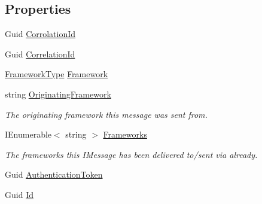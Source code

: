 \subsection*{Properties}
\begin{DoxyCompactItemize}
\item 
Guid \hyperlink{classCqrs_1_1Akka_1_1Tests_1_1Unit_1_1Events_1_1HelloWorldRepliedTo_a899e3a4ea4028b3f13fa31a8af53e02a}{Corrolation\+Id}
\item 
Guid \hyperlink{classCqrs_1_1Akka_1_1Tests_1_1Unit_1_1Events_1_1HelloWorldRepliedTo_ae2bfc25a00d6e3c2e4dcbdee7fc44566}{Correlation\+Id}
\item 
\hyperlink{namespaceCqrs_1_1Messages_af06a7e6cd2609043d0f2f5f3419f81e3}{Framework\+Type} \hyperlink{classCqrs_1_1Akka_1_1Tests_1_1Unit_1_1Events_1_1HelloWorldRepliedTo_a9e4f179ae370d983ba93806a4f922f0e}{Framework}
\item 
string \hyperlink{classCqrs_1_1Akka_1_1Tests_1_1Unit_1_1Events_1_1HelloWorldRepliedTo_aaf5282640ef632abbeb3c4ca733bcdbe}{Originating\+Framework}
\begin{DoxyCompactList}\small\item\em The originating framework this message was sent from. \end{DoxyCompactList}\item 
I\+Enumerable$<$ string $>$ \hyperlink{classCqrs_1_1Akka_1_1Tests_1_1Unit_1_1Events_1_1HelloWorldRepliedTo_ab73af51aaa23b6daa313c5f7a4aac3a5}{Frameworks}
\begin{DoxyCompactList}\small\item\em The frameworks this I\+Message has been delivered to/sent via already. \end{DoxyCompactList}\item 
Guid \hyperlink{classCqrs_1_1Akka_1_1Tests_1_1Unit_1_1Events_1_1HelloWorldRepliedTo_a56fdfd09a1c8cf03014600c5d8bf05a9}{Authentication\+Token}
\item 
Guid \hyperlink{classCqrs_1_1Akka_1_1Tests_1_1Unit_1_1Events_1_1HelloWorldRepliedTo_aadfa9ba9616838db069eaff18b099efe}{Id}

\end{DoxyCompactItemize}
